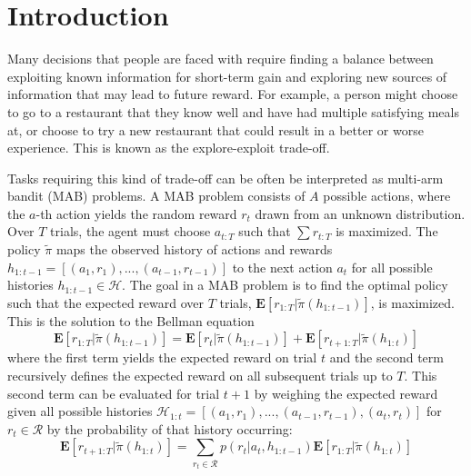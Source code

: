 \documentclass[10pt,letterpaper]{article}
\title{}
\author{}
\begin{document}
	
	\maketitle
	
	
	\begin{abstract}
		
		

		
	\end{abstract}
	
	
	\section{Introduction}
	
	Many decisions that people are faced with require finding a balance between exploiting known information for short-term gain and exploring new sources of information that may lead to future reward. For example, a person might choose to go to a restaurant that they know well and have had multiple satisfying meals at, or choose to try a new restaurant that could result in a better or worse experience. This is known as the explore-exploit trade-off.
	
	Tasks requiring this kind of trade-off can be often be interpreted as multi-arm bandit (MAB) problems. A MAB problem consists of $A$ possible actions, where the $a$-th action yields the random reward $r_{t}$ drawn from an unknown distribution. Over $T$ trials, the agent must choose $a_{t:T}$ such that $\sum r_{t:T}$ is maximized. The policy $\tilde{\pi}$ maps the observed history of actions and rewards $h_{1:t-1} = [(a_{1}, r_{1}),...,(a_{t-1}, r_{t-1})]$ to the next action $a_{t}$ for all possible histories $h_{1:t-1} \in \mathcal{H}$. The goal in a MAB problem is to find the optimal policy such that the expected reward over $T$ trials, $\mathbf{E}[r_{1:T} | \tilde{\pi}( h_{1:t-1})]$, is maximized. This is the solution to the Bellman equation
	\begin{equation}
	\mathbf{E}[r_{1:T} | \tilde{\pi}( h_{1:t-1})] = \mathbf{E}[r_{t} | \tilde{\pi}(h_{1:t-1})] + \mathbf{E}[r_{t+1:T} | \tilde{\pi}( h_{1:t})]
	\end{equation}
	where the first term yields the expected reward on trial $t$ and the second term recursively defines the expected reward on all subsequent trials up to $T$. This second term can be evaluated for trial $t+1$ by weighing the expected reward given all possible histories $ \mathcal{ H}_{1:t} = [(a_{1}, r_{1}),...,(a_{t-1},r_{t-1}),(a_{t},r_{t})]$ for $r_{t} \in \mathcal{R}$ by the probability of that history occurring:
	\begin{equation}
	\mathbf{E}[r_{t+1:T} | \tilde{\pi}( h_{1:t})] = \sum_{r_{t} \in \mathcal{R}} p(r_{t} | a_{t}, h_{1:t-1}) \mathbf{E}[r_{1:T} | \tilde{\pi}( h_{1:t})]
	\end{equation}
\end{document}
